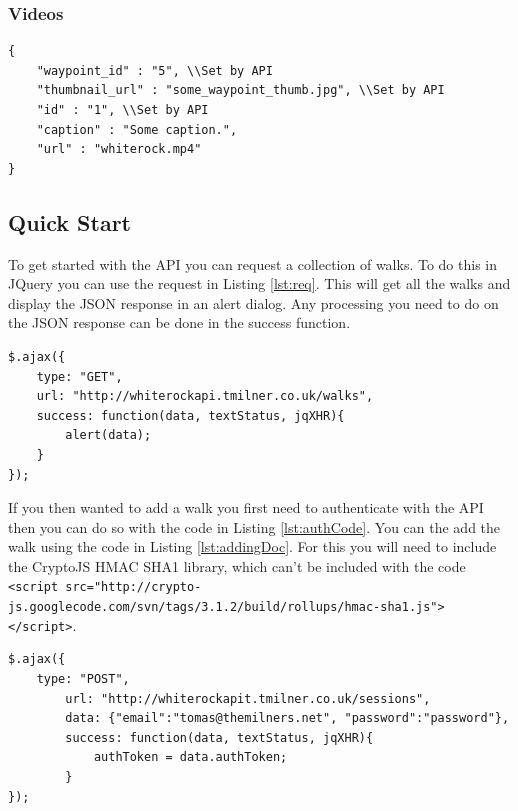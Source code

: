 \documentclass[11pt,a4paper]{report}
\begin{document}
\subsubsection{Videos}

\begin{lstlisting}[captionpos=b, caption=An example JSON Waypoint Object., label=lst:walk]
{
    "waypoint_id" : "5", \\Set by API
    "thumbnail_url" : "some_waypoint_thumb.jpg", \\Set by API
    "id" : "1", \\Set by API
    "caption" : "Some caption.",
    "url" : "whiterock.mp4"
}
\end{lstlisting}

\subsection{Quick Start}

To get started with the API you can request a collection of walks. To do this in JQuery you can use the request in Listing \ref{lst:req}. This will get all the walks and display the JSON response in an alert dialog. Any processing you need to do on the JSON response can be done in the success function.

\begin{lstlisting}[captionpos=b, caption=Basic request code., label=lst:req]
$.ajax({
    type: "GET",
    url: "http://whiterockapi.tmilner.co.uk/walks",
    success: function(data, textStatus, jqXHR){
    	alert(data);
    }
});
\end{lstlisting}

If you then wanted to add a walk you first need to authenticate with the API then you can do so with the code in Listing \ref{lst:authCode}. You can the add the walk using the code in Listing \ref{lst:addingDoc}. For this you will need to include the CryptoJS HMAC SHA1 library, which can't be included with the code \lstinline$<script src="http://crypto-js.googlecode.com/svn/tags/3.1.2/build/rollups/hmac-sha1.js"></script>$.

\begin{lstlisting}[captionpos=b, caption=Basic authorisation code., label=lst:authCode]
$.ajax({
	type: "POST",
    	url: "http://whiterockapit.tmilner.co.uk/sessions",
    	data: {"email":"tomas@themilners.net", "password":"password"}, 
    	success: function(data, textStatus, jqXHR){
    		authToken = data.authToken;
    	}
});
\end{lstlisting}
\end{document}
